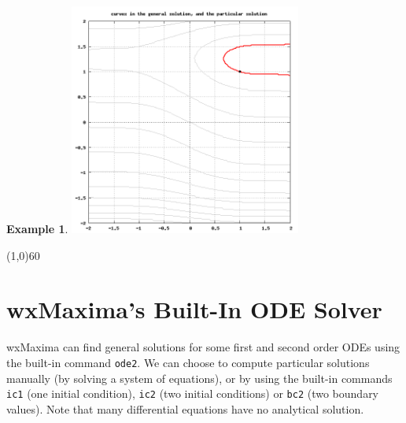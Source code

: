 \documentclass[10.5pt,twoside]{report}
\theoremstyle{definition}
\newtheorem{exmp}{Example}[section]
\begin{document}
\begin{exmp}
\includegraphics[width=3in]{example_4_2_2_1}

\end{exmp}

\line(1,0){60}
\linethickness{0.5mm}
\pagebreak

\pagebreak
\section{wxMaxima's Built-In ODE Solver}\label{wxMaxima's Built-In ODE Solver}

wxMaxima can find general solutions for some first and second order ODEs using the built-in command \verb|ode2|.  We can choose to compute particular solutions manually (by solving a system of equations), or by using the built-in commands \verb|ic1| (one initial condition), \verb|ic2| (two initial conditions) or \verb|bc2| (two boundary values).  Note that many differential equations have no analytical solution.
\end{document}
